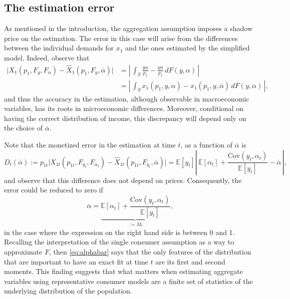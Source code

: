 \documentclass[english, a4paper,12pt]{article}
\begin{document}
\subsection{The estimation error} \label{ssec:RepAgError}
As mentioned in the introduction, the aggregation assumption imposes a shadow price on the estimation. The error in this case will arise from the differences between the individual demands for $x_{1}$ and the ones estimated by the simplified model. Indeed, observe that
	\begin{align*}
		\Big| X_{1}(p_{1}, F_{y}, F_{\alpha}) - \widehat{X}_{1}(p_{1}, F_{y}, \overline{\alpha}) \Big|
			&=	\left|\, \int_{S} \frac{y \alpha}{p_{1}} - \frac{y\overline{\alpha}}{p_{1}} \, dF(y,\alpha) \,\right|	\\
			&=	\left|\, \int_{S} x_{1}(p_{1}, y, \alpha) - x_{1}(p_{1}, y, \overline{\alpha}) \, dF(y,\alpha)\, \right|,
	\end{align*}
and thus the accuracy in the estimation, although observable in macroeconomic variables, has its roots in microeconomic differences. Moreover, conditional on having the correct distribution of income, this discrepancy will depend only on the choice of $\overline{\alpha}$. 

Note that the monetized error in the estimation at time $t$, as a function of $\overline{\alpha}$ is
	\begin{equation} \label{eq:DiffAgRep}
		D_{t}(\overline{\alpha}) 
		 	:= p_{1t}\Big| X_{1t}(p_{1t}, F_{y_{t}}, F_{\alpha_{t}}) - \widehat{X}_{1t}(p_{1t}, F_{y_{t}}, \overline{\alpha}) \Big|
			=	\mathbb{E}[y_{t}]\left|\, \mathbb{E}[\alpha_{t}] + \frac{\mathrm{Cov}(y_{t},\alpha_{t})}{\mathbb{E}[y_{t}]} - \overline{\alpha}\,\right|,
	\end{equation}
and observe that this difference does not depend on prices. Consequently, the error could be reduced to zero if
	\begin{equation} \label{eq:alphabar}
		\overline{\alpha} = \underbrace{\mathbb{E}[\alpha_{t}] + \frac{\mathrm{Cov}(y_{t}, \alpha_{t})}{\mathbb{E}[y_{t}]}}_{:= M_{t}},
	\end{equation}
in the case where the expression on the right hand side is between 0 and 1. Recalling the interpretation of the single consumer assumption as a way to approximate $F$, then \eqref{eq:alphabar} says that the only features of the distribution that are important to have an exact fit at time $t$ are its first and second moments. This finding suggests that what matters when estimating aggregate variables using representative consumer models are a finite set of statistics of the underlying distribution of the population.
\end{document}
